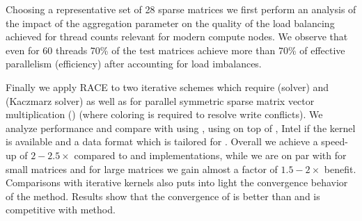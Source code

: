 Choosing a representative set of 28 sparse matrices we first perform an analysis of the impact of the aggregation parameter on the quality of the load balancing achieved for thread counts relevant for modern compute nodes. We observe that even for 60 threads 70\% of the test matrices achieve more than 70\% of effective parallelism (efficiency) after accounting for load imbalances.

Finally we apply RACE to two iterative schemes which require \DONE (\GS solver) and \DTWO (Kaczmarz solver) as well as for parallel symmetric sparse matrix vector multiplication (\SymmSpmv)  (where \DTWO coloring is required to resolve write conflicts). We analyze \RACE performance and compare with \MC using \COLPACK, \ABMC using \COLPACK on top of \METIS, Intel \MKL if the kernel is available and a data format which is tailored for \SymmSpmv. Overall we achieve a speed-up of $2-2.5 \times$ compared to \MC and \MKL implementations, while we are on par with \ABMC for small matrices and for large matrices we gain almost a factor of $1.5-2 \times$ benefit. Comparisons with iterative kernels also puts into light the convergence behavior of the method. Results show that the convergence of \RACE is better than \MC and is competitive with \ABMC method.